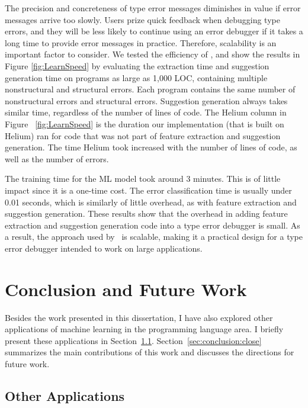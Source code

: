\documentclass[12pt]{report}	%
\begin{document}
The precision and concreteness
of type error messages diminishes
in value if error messages
arrive too slowly. Users prize
quick feedback when debugging type errors,
and they will be less likely to continue using
an error debugger if it takes a long time
to provide error messages in practice.
Therefore, scalability is an important factor to consider. 
We tested the efficiency of \newCompiler,
and show the results in Figure \ref{fig:LearnSpeed} by evaluating
the extraction time and suggestion generation time on
programs as large as 1,000 LOC, containing multiple nonstructural
and structural errors. Each program contains the same number
of nonstructural errors and structural errors. 
%
Suggestion generation always takes
similar time, regardless of the number of lines of code.
%
The Helium column in Figure ~\ref{fig:LearnSpeed} is the duration
our implementation (that is built on
%
Helium) ran for code that was not part of feature extraction and suggestion
generation. 
%
The
time Helium took increased with the number of lines of code,
as well as the number of errors.

The training time for
the ML model took around 3
minutes. This is of little
impact since it is a one-time cost.
The error classification time
is usually under 0.01 seconds, 
which is similarly of
little overhead, as with
feature extraction and
suggestion generation.
These results show that the
overhead in adding feature extraction and suggestion generation code into
a type error debugger is small. 
As a result, the approach used by \newCompiler\
is scalable, making it a practical design for
a type error debugger intended to work on large applications.

\chapter{Conclusion and Future Work}
\label{sec:conclusion}

Besides the work presented in this dissertation, 
I have also explored other applications of machine learning in the programming language area.
I briefly present these applications in Section~\ref{sec:conclusion:other}.
Section~\ref{sec:conclusion:close} summarizes the main contributions
of this work and discusses the directions for future work.

\section{Other Applications}
\label{sec:conclusion:other}
\end{document}
